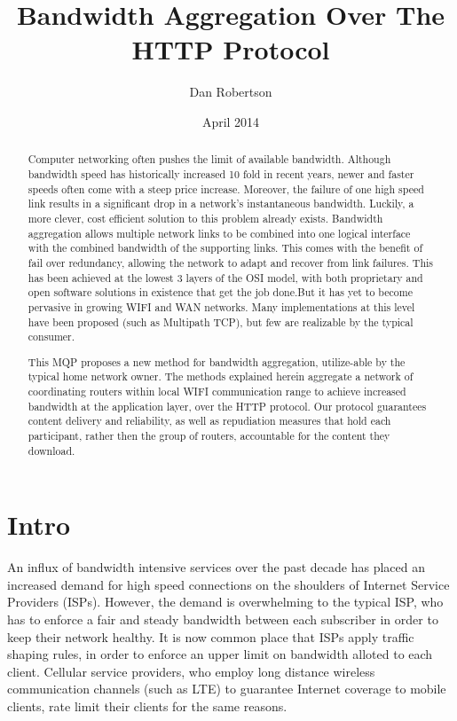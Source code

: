 \documentclass[12pt]{article}
\begin{document}
\title{Bandwidth Aggregation Over The HTTP Protocol}
\author{Dan Robertson}
\date{April 2014}
\maketitle

\begin{abstract}
	Computer networking often pushes the limit of available bandwidth. Although bandwidth speed has historically increased 10 fold in recent years, newer and faster speeds often come with a steep price increase. Moreover, the failure of one high speed link results in a significant drop in a network's instantaneous bandwidth. Luckily, a more clever, cost efficient solution to this problem already exists. Bandwidth aggregation allows multiple network links to be combined into one logical interface with the combined bandwidth of the supporting links. This comes with the benefit of fail over redundancy, allowing the network to adapt and recover from link failures. This has been achieved at the lowest 3 layers of the OSI model, with both proprietary and open software solutions in existence that get the job done.But it has yet to become pervasive in growing WIFI and WAN networks. Many implementations at this level have been proposed (such as Multipath TCP), but few are realizable by the typical consumer.

	This MQP proposes a new method for bandwidth aggregation, utilize-able by the typical home network owner. The methods explained herein aggregate a network of coordinating routers within local WIFI communication range to achieve increased bandwidth at the application layer, over the HTTP protocol. Our protocol guarantees content delivery and reliability, as well as repudiation measures that hold each participant, rather then the group of routers, accountable for the content they download.
\end{abstract}


\newpage
\section{Intro}

	An influx of bandwidth intensive services over the past decade has placed an increased demand for high speed connections on the shoulders of Internet Service Providers (ISPs). However, the demand is overwhelming to the typical ISP, who has to enforce a fair and steady bandwidth between each subscriber in order to keep their network healthy. It is now common place that ISPs apply traffic shaping rules, in order to enforce an upper limit on bandwidth alloted to each client. Cellular service providers, who employ long distance wireless communication channels (such as LTE) to guarantee Internet coverage to mobile clients, rate limit their clients for the same reasons. 
\end{document}
